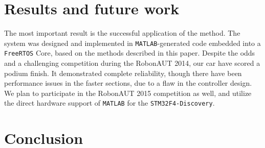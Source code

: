 \section{Results and future work}

The most important result is the successful application of the method. The system was designed and implemented in \verb!MATLAB!-generated code embedded into a \verb!FreeRTOS! Core, based on the methods described in this paper. Despite the odds and a challenging competition during the RobonAUT 2014, our car have scored a podium finish. It demonstrated complete reliability, though there have been performance issues in the faster sections, due to a flaw in the controller design. We plan to participate in the RobonAUT 2015 competition as well, and utilize the direct hardware support of \verb!MATLAB! for the \verb!STM32F4-Discovery!.

\section{Conclusion}

